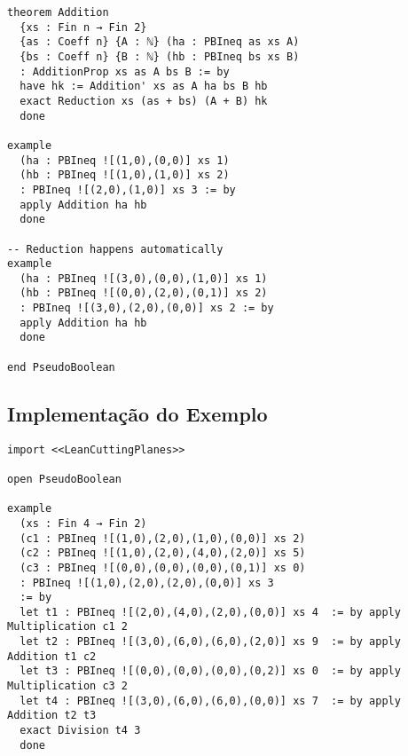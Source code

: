 \documentclass[conference]{IEEEtran}
\begin{document}
\begin{verbatim}
theorem Addition
  {xs : Fin n → Fin 2}
  {as : Coeff n} {A : ℕ} (ha : PBIneq as xs A)
  {bs : Coeff n} {B : ℕ} (hb : PBIneq bs xs B)
  : AdditionProp xs as A bs B := by
  have hk := Addition' xs as A ha bs B hb
  exact Reduction xs (as + bs) (A + B) hk
  done

example
  (ha : PBIneq ![(1,0),(0,0)] xs 1)
  (hb : PBIneq ![(1,0),(1,0)] xs 2)
  : PBIneq ![(2,0),(1,0)] xs 3 := by
  apply Addition ha hb
  done

-- Reduction happens automatically
example
  (ha : PBIneq ![(3,0),(0,0),(1,0)] xs 1)
  (hb : PBIneq ![(0,0),(2,0),(0,1)] xs 2)
  : PBIneq ![(3,0),(2,0),(0,0)] xs 2 := by
  apply Addition ha hb
  done

end PseudoBoolean

\end{verbatim}
\newpage

\subsection{Implementação do Exemplo}
\begin{verbatim}
import <<LeanCuttingPlanes>>

open PseudoBoolean

example
  (xs : Fin 4 → Fin 2)
  (c1 : PBIneq ![(1,0),(2,0),(1,0),(0,0)] xs 2)
  (c2 : PBIneq ![(1,0),(2,0),(4,0),(2,0)] xs 5)
  (c3 : PBIneq ![(0,0),(0,0),(0,0),(0,1)] xs 0)
  : PBIneq ![(1,0),(2,0),(2,0),(0,0)] xs 3
  := by
  let t1 : PBIneq ![(2,0),(4,0),(2,0),(0,0)] xs 4  := by apply Multiplication c1 2
  let t2 : PBIneq ![(3,0),(6,0),(6,0),(2,0)] xs 9  := by apply Addition t1 c2
  let t3 : PBIneq ![(0,0),(0,0),(0,0),(0,2)] xs 0  := by apply Multiplication c3 2
  let t4 : PBIneq ![(3,0),(6,0),(6,0),(0,0)] xs 7  := by apply Addition t2 t3
  exact Division t4 3
  done
\end{verbatim}
\end{document}
